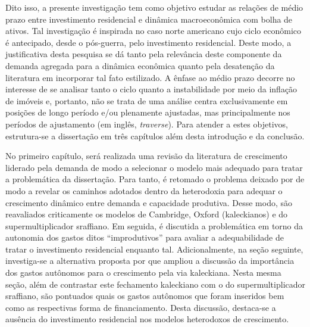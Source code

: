 Dito isso, a presente investigação tem como objetivo estudar as relações de médio prazo entre investimento residencial e dinâmica macroeconômica com bolha de ativos. 
Tal investigação é inspirada no caso norte americano cujo ciclo econômico é antecipado, desde o pós-guerra, pelo investimento residencial. Deste modo, a justificativa desta pesquisa se dá tanto pela relevância deste componente da demanda agregada para a dinâmica econômica quanto pela desatenção da literatura em incorporar tal fato estilizado. 
A ênfase ao médio prazo decorre no interesse de se analisar tanto o ciclo quanto a instabilidade por meio da inflação de imóveis e, portanto, não se trata de uma análise centra exclusivamente em posições de longo período e/ou plenamente ajustadas, mas principalmente nos períodos de ajustamento (em inglês, \textit{traverse}).
Para atender a estes objetivos, estrutura-se a dissertação em três capítulos além desta introdução e da conclusão.

No primeiro capítulo, será realizada uma revisão da literatura de crescimento liderado pela demanda de modo a selecionar o modelo mais adequado para tratar a problemática da dissertação. Para tanto, é retomado o problema deixado por \textcite{harrod_essay_1939} de modo a revelar os caminhos adotados dentro da heterodoxia para adequar o crescimento dinâmico entre demanda e capacidade produtiva. Desse modo, são reavaliados criticamente os modelos de Cambridge, Oxford (kaleckianos) e do supermultiplicador sraffiano. 
Em seguida, é discutida a problemática em torno da autonomia dos gastos ditos ``improdutivos'' para avaliar a adequabilidade de tratar o investimento residencial enquanto tal.
Adicionalmente, na seção seguinte, investiga-se a alternativa proposta por \textcite{allain_tackling_2015} que 
ampliou a discussão da importância dos gastos autônomos para o crescimento pela via kaleckiana. 
Nesta mesma seção, além de contrastar este fechamento kaleckiano com o do supermultiplicador sraffiano, são pontuados quais os gastos autônomos que foram inseridos bem como as respectivas forma de financiamento.
Desta discussão, destaca-se a ausência do investimento residencial nos modelos heterodoxos de crescimento. %




